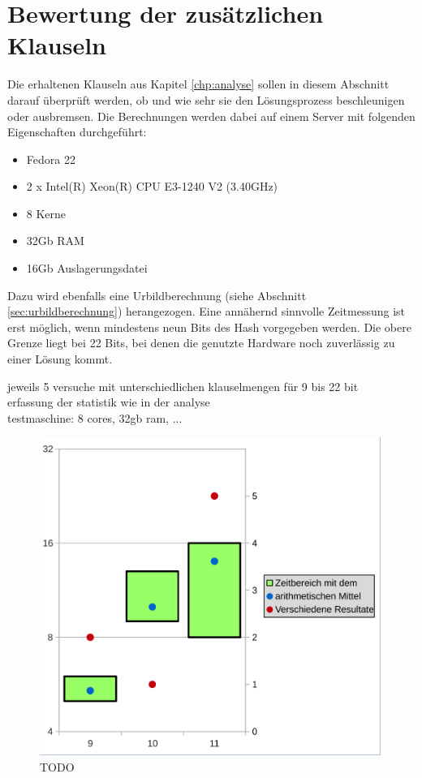 \chapter{Bewertung der zusätzlichen Klauseln}
\label{chp:bewertung}

Die erhaltenen Klauseln aus Kapitel \ref{chp:analyse} sollen in diesem Abschnitt darauf überprüft werden,
ob und wie sehr sie den Lösungsprozess beschleunigen oder ausbremsen. Die Berechnungen werden dabei auf einem
Server mit folgenden Eigenschaften durchgeführt:
\begin{itemize}
  \item Fedora 22
  \item 2 x Intel(R) Xeon(R) CPU E3-1240 V2 (3.40GHz)
  \item 8 Kerne
  \item 32Gb RAM
  \item 16Gb Auslagerungsdatei
\end{itemize}




Dazu wird ebenfalls eine Urbildberechnung
(siehe Abschnitt \ref{sec:urbildberechnung}) herangezogen. Eine annähernd sinnvolle Zeitmessung ist erst möglich,
wenn mindestens neun Bits des Hash vorgegeben werden. Die obere Grenze liegt bei 22 Bits, bei denen die genutzte
Hardware noch zuverlässig zu einer Lösung kommt. 



jeweils 5 versuche mit unterschiedlichen klauselmengen für 9 bis 22 bit\\
erfassung der statistik wie in der analyse\\

testmaschine: 8 cores, 32gb ram, ...

\begin{figure}[!h]
  \centering
  \includegraphics[scale=0.55]{images/data_legend}
  \caption{TODO}
  \label{fig:data_lengede}
\end{figure}

